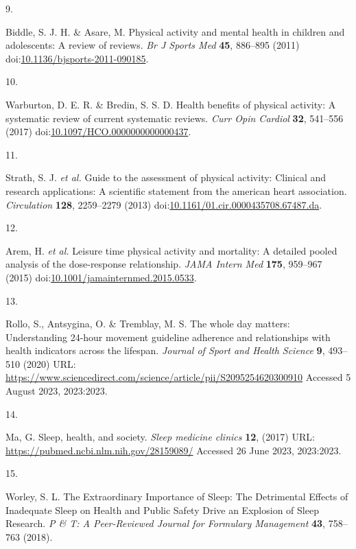 \documentclass[
  10pt,
]{scrbook}
\newlength{\cslhangindent}
\newlength{\csllabelwidth}
\newlength{\cslentryspacingunit} %
\newenvironment{CSLReferences}[2] %
 {%
  \setlength{\parindent}{0pt}
  \ifodd #1
  \let\oldpar\par
  \def\par{\hangindent=\cslhangindent\oldpar}
  \fi
  \setlength{\parskip}{#2\cslentryspacingunit}
 }%
 {}
\newcommand{\CSLLeftMargin}[1]{\parbox[t]{\csllabelwidth}{#1}}
\newcommand{\CSLRightInline}[1]{\parbox[t]{\linewidth - \csllabelwidth}{#1}\break}
\begin{document}
\begin{CSLReferences}{0}{0}
\leavevmode{}%
\CSLLeftMargin{9. }%
\CSLRightInline{Biddle, S. J. H. \& Asare, M. Physical activity and
mental health in children and adolescents: A review of reviews. \emph{Br
J Sports Med} \textbf{45}, 886--895 (2011)
doi:\href{https://doi.org/10.1136/bjsports-2011-090185}{10.1136/bjsports-2011-090185}.}

\leavevmode{}%
\CSLLeftMargin{10. }%
\CSLRightInline{Warburton, D. E. R. \& Bredin, S. S. D. Health benefits
of physical activity: A systematic review of current systematic reviews.
\emph{Curr Opin Cardiol} \textbf{32}, 541--556 (2017)
doi:\href{https://doi.org/10.1097/HCO.0000000000000437}{10.1097/HCO.0000000000000437}.}

\leavevmode{}%
\CSLLeftMargin{11. }%
\CSLRightInline{Strath, S. J. \emph{et al.} Guide to the assessment of
physical activity: Clinical and research applications: A scientific
statement from the american heart association. \emph{Circulation}
\textbf{128}, 2259--2279 (2013)
doi:\href{https://doi.org/10.1161/01.cir.0000435708.67487.da}{10.1161/01.cir.0000435708.67487.da}.}

\leavevmode{}%
\CSLLeftMargin{12. }%
\CSLRightInline{Arem, H. \emph{et al.} Leisure time physical activity
and mortality: A detailed pooled analysis of the dose-response
relationship. \emph{{JAMA} Intern Med} \textbf{175}, 959--967 (2015)
doi:\href{https://doi.org/10.1001/jamainternmed.2015.0533}{10.1001/jamainternmed.2015.0533}.}

\leavevmode{}%
\CSLLeftMargin{13. }%
\CSLRightInline{Rollo, S., Antsygina, O. \& Tremblay, M. S. The whole
day matters: Understanding 24-hour movement guideline adherence and
relationships with health indicators across the lifespan. \emph{Journal
of Sport and Health Science} \textbf{9}, 493--510 (2020) URL:
\url{https://www.sciencedirect.com/science/article/pii/S2095254620300910}
Accessed 5 August 2023, 2023:2023.}

\leavevmode{}%
\CSLLeftMargin{14. }%
\CSLRightInline{Ma, G. Sleep, health, and society. \emph{Sleep medicine
clinics} \textbf{12}, (2017) URL:
\url{https://pubmed.ncbi.nlm.nih.gov/28159089/} Accessed 26 June 2023,
2023:2023.}

\leavevmode{}%
\CSLLeftMargin{15. }%
\CSLRightInline{Worley, S. L. The Extraordinary Importance of Sleep: The
Detrimental Effects of Inadequate Sleep on Health and Public Safety
Drive an Explosion of Sleep Research. \emph{P \& T: A Peer-Reviewed
Journal for Formulary Management} \textbf{43}, 758--763 (2018).}


\end{CSLReferences}
\end{document}
